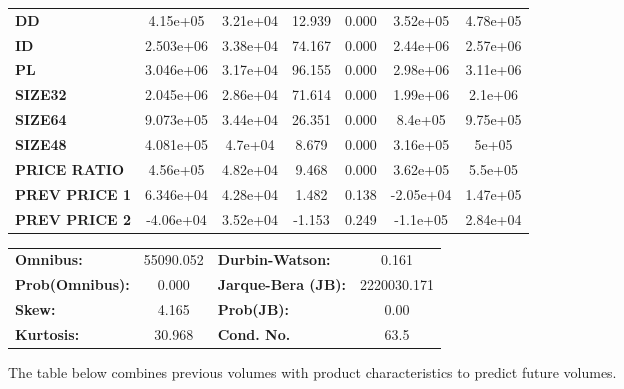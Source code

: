 \documentclass{article}
\begin{document}
\begin{center}
\begin{tabular}{lcccccc}
\textbf{DD}    &     4.15e+05  &     3.21e+04     &    12.939  &         0.000        &     3.52e+05    &     4.78e+05     \\
\textbf{ID}    &    2.503e+06  &     3.38e+04     &    74.167  &         0.000        &     2.44e+06    &     2.57e+06     \\
\textbf{PL}    &    3.046e+06  &     3.17e+04     &    96.155  &         0.000        &     2.98e+06    &     3.11e+06     \\
\textbf{SIZE32}    &    2.045e+06  &     2.86e+04     &    71.614  &         0.000        &     1.99e+06    &      2.1e+06     \\
\textbf{SIZE64}   &    9.073e+05  &     3.44e+04     &    26.351  &         0.000        &      8.4e+05    &     9.75e+05     \\
\textbf{SIZE48}   &    4.081e+05  &      4.7e+04     &     8.679  &         0.000        &     3.16e+05    &        5e+05     \\
\textbf{PRICE RATIO}   &     4.56e+05  &     4.82e+04     &     9.468  &         0.000        &     3.62e+05    &      5.5e+05     \\
\textbf{PREV PRICE 1}   &    6.346e+04  &     4.28e+04     &     1.482  &         0.138        &    -2.05e+04    &     1.47e+05     \\
\textbf{PREV PRICE 2}   &    -4.06e+04  &     3.52e+04     &    -1.153  &         0.249        &     -1.1e+05    &     2.84e+04     \\
\bottomrule
\end{tabular}
\begin{tabular}{lclc}
\textbf{Omnibus:}       & 55090.052 & \textbf{  Durbin-Watson:     } &      0.161   \\
\textbf{Prob(Omnibus):} &    0.000  & \textbf{  Jarque-Bera (JB):  } & 2220030.171  \\
\textbf{Skew:}          &    4.165  & \textbf{  Prob(JB):          } &       0.00   \\
\textbf{Kurtosis:}      &   30.968  & \textbf{  Cond. No.          } &       63.5   \\
\bottomrule
\end{tabular}
\end{center} 


 The table below combines previous volumes with product characteristics to predict future volumes.
\end{document}

